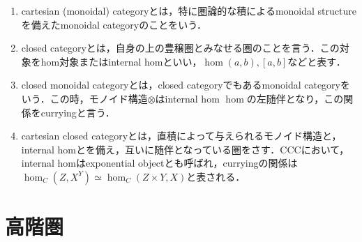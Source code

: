 \documentclass[uplatex,dvipdfmx]{jsreport}
\begin{document}
\begin{definition}\mbox{}
    \begin{enumerate}
        \item cartesian (monoidal) categoryとは，特に圏論的な積によるmonoidal structureを備えたmonoidal categoryのことをいう．
        \item closed categoryとは，自身の上の豊穣圏とみなせる圏のことを言う．この対象をhom対象またはinternal homといい，$\hom(a,b),[a,b]$などと表す．
        \item closed monoidal categoryとは，closed categoryでもあるmonoidal categoryをいう．この時，モノイド構造$\otimes$はinternal hom $\hom$の左随伴となり，この関係をcurryingと言う．
        \item cartesian closed categoryとは，直積によって与えられるモノイド構造と，internal homとを備え，互いに随伴となっている圏をさす．CCCにおいて，internal homはexponential objectとも呼ばれ，curryingの関係は$\hom_C(Z,X^Y)\simeq\hom_C(Z\times Y,X)$と表される．
    \end{enumerate}
\end{definition}

\section{高階圏}
\end{document}
